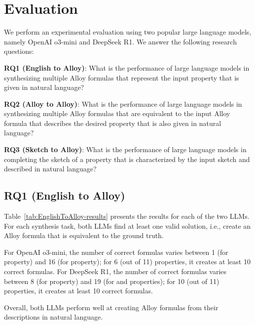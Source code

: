 \section{Evaluation}
\label{sec:evaluation}

We perform an experimental evaluation using two popular large language models, namely OpenAI o3-mini and DeepSeek R1. We answer the following research questions:

\textbf{RQ1 (English to Alloy)}: What is the performance of large language models in synthesizing multiple Alloy formulas that represent the input property that is given in natural language?

\textbf{RQ2 (Alloy to Alloy)}: What is the performance of large language models in synthesizing multiple Alloy formulas that are equivalent to the input Alloy formula that describes the desired property that is also given in natural language?

\textbf{RQ3 (Sketch to Alloy)}: What is the performance of large language models in completing the sketch of a property that is characterized by the input sketch and described in natural language?

\subsection{RQ1 (English to Alloy)}



Table~\ref{tab:EnglishToAlloy-results} presents the results for each of the two LLMs. For each synthesis task, both LLMs find at least one valid solution, i.e., create an Alloy formula that is equivalent to the ground truth.

For OpenAI o3-mini, the number of correct formulas varies between 1 (for  property) and 16 (for  property); for 6 (out of 11) properties, it creates at least 10 correct formulas. For DeepSeek R1, the number of correct formulas varies between 8 (for  property) and 19 (for  and  properties); for 10 (out of 11) properties, it creates at least 10 correct formulas.

Overall, both LLMs perform well at creating Alloy formulas from their descriptions in natural language.


